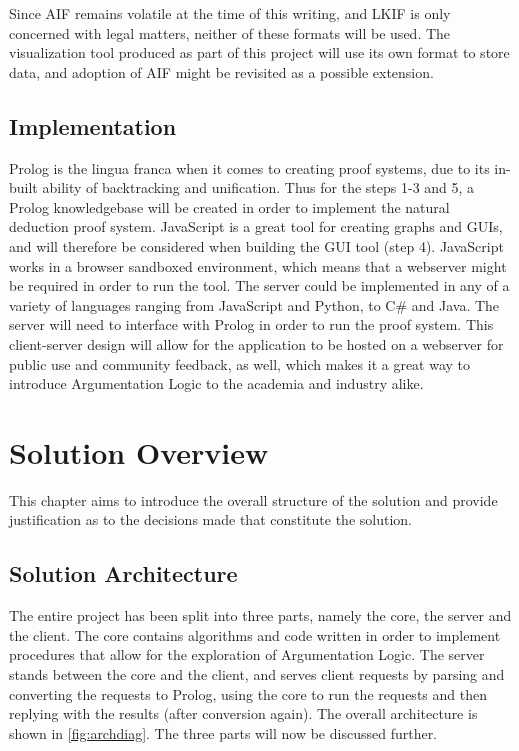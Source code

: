 \documentclass[11pt,twoside,a4paper]{report}
\begin{document}
Since AIF remains volatile at the time of this writing, and LKIF is only concerned with legal matters, neither of these formats will be used. The visualization tool produced as part of this project will use its own format to store data, and adoption of AIF might be revisited as a possible extension.

\section{Implementation}
Prolog is the lingua franca when it comes to creating proof systems, due to its in-built ability of backtracking and unification. Thus for the steps 1-3 and 5, a Prolog knowledgebase will be created in order to implement the natural deduction proof system.
JavaScript is a great tool for creating graphs and GUIs, and will therefore be considered when building the GUI tool (step 4). JavaScript works in a browser sandboxed environment, which means that a webserver might be required in order to run the tool. The server could be implemented in any of a variety of languages ranging from JavaScript and Python, to C\# and Java. The server will need to interface with Prolog in order to run the proof system. 
This client-server design will allow for the application to be hosted on a webserver for public use and community feedback, as well, which makes it a great way to introduce Argumentation Logic to the academia and industry alike.

\chapter{Solution Overview}
This chapter aims to introduce the overall structure of the solution and provide justification as to the decisions made that constitute the solution.

\section{Solution Architecture}
\label{sec:solarch}
The entire project has been split into three parts, namely the core, the server and the client. The core contains algorithms and code written in order to implement procedures that allow for the exploration of Argumentation Logic. The server stands between the core and the client, and serves client requests by parsing and converting the requests to Prolog, using the core to run the requests and then replying with the results (after conversion again). The overall architecture is shown in \autoref{fig:archdiag}. The three parts will now be discussed further.
\end{document}
